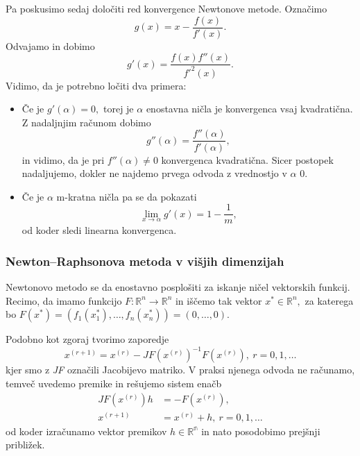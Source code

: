 \documentclass[12pt,a4paper]{amsart}
\theoremstyle{definition} %
\theoremstyle{plain} %
\begin{document}
Pa poskusimo sedaj določiti red konvergence Newtonove metode. Označimo
\[
    g(x) = x - \frac{f(x)}{f'(x)}.
\]
Odvajamo in dobimo
\[
    g'(x) = \frac{f(x)f''(x)}{f'^{2}(x)}.
\]
Vidimo, da je potrebno ločiti dva primera:
\begin{itemize}
    \item Če je $g'(\alpha) = 0,$ torej je $\alpha$ enostavna ničla je konvergenca vsaj kvadratična. Z nadaljnjim računom dobimo
    \[
        g''(\alpha) = \frac{f''(\alpha)}{f'(\alpha)},
    \]
    in vidimo, da je pri $f''(\alpha) \neq 0$ konvergenca kvadratična. Sicer postopek nadaljujemo, dokler ne najdemo prvega odvoda z vrednostjo v $\alpha$ 0.
    \item Če je $\alpha$ m-kratna ničla pa se da pokazati
    \[
        \lim_{x\to\alpha} g'(x) = 1 - \frac{1}{m},
    \]
    od koder sledi linearna konvergenca.
\end{itemize}
\subsubsection{Newton--Raphsonova metoda v višjih dimenzijah}
Newtonovo metodo se da enostavno posplošiti za iskanje ničel vektorskih funkcij. Recimo, da imamo funkcijo $F:\mathbb{R}^{n} \rightarrow \mathbb{R}^{n}$ in iščemo tak
vektor $x^{*} \in \mathbb{R}^{n},$ za katerega bo $F(x^{*}) = (f_{1}(x^{*}_{1}),\ldots,f_{n}(x^{*}_{n})) = (0,\ldots,0).$

Podobno kot zgoraj tvorimo zaporedje
\[
    x^{(r+1)} = x^{(r)} - JF(x^{(r)})^{-1}F(x^{(r)}),~r=0,1,\ldots
\]
kjer smo z \textit{JF} označili Jacobijevo matriko. V praksi njenega odvoda ne računamo, temveč uvedemo premike in rešujemo sistem enačb
\begin{align*}
    JF(x^{(r)}) h &= -F(x^{(r)}),\\
    x^{(r+1)} &= x^{(r)} + h,~r=0,1,\ldots
\end{align*}
od koder izračunamo vektor premikov $h \in \mathbb{R^n}$ in nato posodobimo prejšnji približek.
\end{document}
